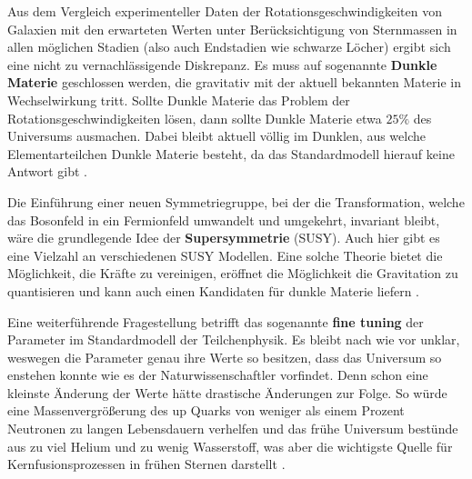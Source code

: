 Aus dem Vergleich experimenteller Daten der Rotationsgeschwindigkeiten von Galaxien mit den erwarteten Werten unter Berücksichtigung von Sternmassen in allen möglichen Stadien (also auch Endstadien wie schwarze Löcher) ergibt sich eine nicht zu vernachlässigende Diskrepanz. Es muss auf sogenannte \textbf{Dunkle Materie} geschlossen werden, die gravitativ mit der aktuell bekannten Materie in Wechselwirkung tritt. Sollte Dunkle Materie das Problem der Rotationsgeschwindigkeiten lösen, dann sollte Dunkle Materie etwa $25\%$ des Universums ausmachen. Dabei bleibt aktuell völlig im Dunklen, aus welche Elementarteilchen Dunkle Materie besteht, da das Standardmodell hierauf keine Antwort gibt \cite{PhysTeV}. %



Die Einführung einer neuen Symmetriegruppe, bei der die Transformation, welche das Bosonfeld in ein Fermionfeld umwandelt und umgekehrt, invariant bleibt, wäre die grundlegende Idee der \textbf{Supersymmetrie} (SUSY). Auch hier gibt es eine Vielzahl an verschiedenen SUSY Modellen. Eine solche Theorie bietet die Möglichkeit, die Kräfte zu vereinigen, eröffnet die Möglichkeit die Gravitation zu quantisieren und kann auch einen Kandidaten für dunkle Materie liefern \cite{Nagashima}. 

Eine weiterführende Fragestellung betrifft das sogenannte \textbf{fine tuning} der Parameter im Standardmodell der Teilchenphysik. Es bleibt nach wie vor unklar, weswegen die Parameter genau ihre Werte so besitzen, dass das Universum so enstehen konnte wie es der Naturwissenschaftler vorfindet. Denn schon eine kleinste Änderung der Werte hätte drastische Änderungen zur Folge. So würde eine Massenvergrößerung des up Quarks von weniger als einem Prozent Neutronen zu langen Lebensdauern verhelfen und das frühe Universum bestünde aus zu viel Helium und zu wenig Wasserstoff, was aber die wichtigste Quelle für Kernfusionsprozessen in frühen Sternen darstellt \cite{Mann}.%

